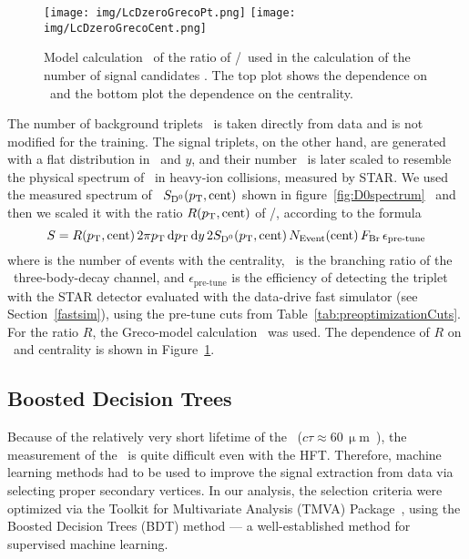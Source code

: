\begin{figure}[!htb]
\centering
\texttt{[image: img/LcDzeroGrecoPt.png]}
\texttt{[image: img/LcDzeroGrecoCent.png]}

\caption[Model calculation of the ratio of \Lambdac/\dzero\ used in the calculation of the number of signal candidates.]{\label{fig:greco}Model calculation~\cite{PlumariGreco} of the ratio of \Lambdac/\dzero\ used in the calculation of the number of signal candidates \Nsig\@. The top plot shows the dependence on \pt\ and the bottom plot the dependence on the centrality.}

\end{figure}

The number of background triplets \Nbkg{}\ is taken directly from data and is not modified for the training. The signal triplets, on the other hand, are generated with a flat distribution in \pt\ and $y$, and their number \Nsig{}\ is later scaled to resemble the physical spectrum of \Lambdac\ in heavy-ion collisions, measured by STAR\@. We used the measured spectrum of \dzero\  $S_{{\text{D}^0}}({p_{\mathrm{T}}}, \mathrm{cent})$ shown in figure~\ref{fig:D0spectrum}~\cite{D0paper} and then we scaled it with the ratio $R({p_{\mathrm{T}}}, \mathrm{cent})$ of \dzero/\Lambdac, according to the formula
\begin{equation}
 S = R({p_{\mathrm{T}}}, \mathrm{cent}) \,2\pi {p_{\mathrm{T}}} \,\mathrm{d}{p_{\mathrm{T}}} \,\mathrm{d} y \,2S_{{\text{D}^0}}({p_{\mathrm{T}}}, \mathrm{cent})\, N_\mathrm{Event}(\mathrm{cent})\, F_\mathrm{Br}\, \epsilon_\text{pre-tune}
\end{equation}
where \Nevt{} is the number of events with the centrality, \branching\ is the branching ratio of the \pKpi\ three-body-decay channel, and $\epsilon_\text{pre-tune}$ is the efficiency of detecting the triplet with the STAR detector evaluated with the data-drive fast simulator (see Section~\ref{fastsim}), using the pre-tune cuts from Table~\ref{tab:preoptimizationCuts}\@.
For the ratio $R$, the Greco-model calculation~\cite{PlumariGreco} was used. The dependence of $R$ on \pt\ and centrality is shown in Figure~\ref{fig:greco}\@.

\subsection{Boosted Decision Trees}

Because of the relatively very short lifetime of the \Lambdac\ ($c\tau \approx 60\,\upmu$m~\cite{PDG}), the measurement of the \Lambdac\ is quite difficult even with the HFT\@. Therefore, machine learning methods had to be used to improve the signal extraction from data via selecting proper secondary vertices.
In our analysis, the selection criteria were optimized via the Toolkit for Multivariate Analysis (TMVA) Package~\cite{TMVA}, using the Boosted Decision Trees (BDT) method --- a well-established method for supervised machine learning.


